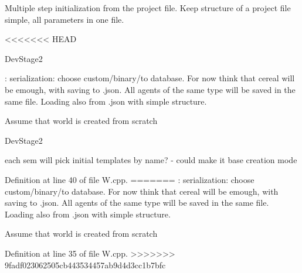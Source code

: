 Multiple step initialization from the project file. Keep structure of a project file simple, all parameters in one file.

<<<<<<< HEAD
\begin{DoxyRefDesc}{Dev\+Stage2}
\item[\hyperlink{_dev_stage2__DevStage2000029}{Dev\+Stage2}]\+: serialization\+: choose custom/binary/to database. For now think that cereal will be emough, with saving to .json. All agents of the same type will be saved in the same file. Loading also from .json with simple structure.\end{DoxyRefDesc}


Assume that world is created from scratch \begin{DoxyRefDesc}{Dev\+Stage2}
\item[\hyperlink{_dev_stage2__DevStage2000028}{Dev\+Stage2}]each sem will pick initial templates by name? -\/ could make it base creation mode \end{DoxyRefDesc}


Definition at line 40 of file W.\+cpp.
=======
\+: serialization\+: choose custom/binary/to database. For now think that cereal will be emough, with saving to .json. All agents of the same type will be saved in the same file. Loading also from .json with simple structure.

Assume that world is created from scratch 

Definition at line 35 of file W.\+cpp.
>>>>>>> 9fadf023062505cb443534457ab9d4d3cc1b7bfc



